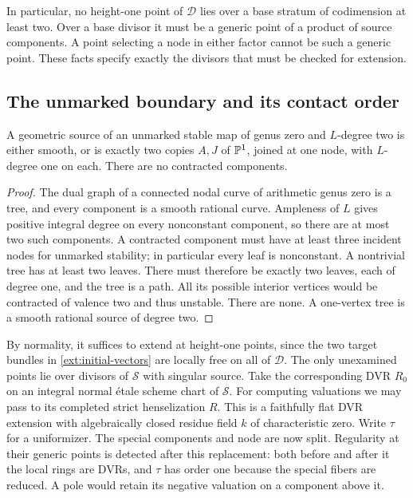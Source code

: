 In particular, no height-one point of $\mathcal D$ lies over a base
stratum of codimension at least two. Over a base divisor it must be
a generic point of a product of source components. A point selecting
a node in either factor cannot be such a generic point. These facts
specify exactly the divisors that must be checked for extension.

\subsection{The unmarked boundary and its contact order}

\begin{lemma}\label{ext:trees}
A geometric source of an unmarked stable map of genus zero and
$L$-degree two is either smooth, or is exactly two copies $A,J$ of
$\mathbb P^1$, joined at one node, with $L$-degree one on each. There are
no contracted components.
\end{lemma}

\begin{proof}
The dual graph of a connected nodal curve of arithmetic genus zero
is a tree, and every component is a smooth rational curve. Ampleness
of $L$ gives positive integral degree on every nonconstant component,
so there are at most two such components. A contracted component
must have at least three incident nodes for unmarked stability;
in particular every leaf is nonconstant. A nontrivial tree has at
least two leaves. There must therefore be exactly two leaves, each
of degree one, and the tree is a path. All its possible interior
vertices would be contracted of valence two and thus unstable.
There are none. A one-vertex tree is a smooth rational source of
degree two.
\end{proof}

By normality, it suffices to extend at height-one points, since the
two target bundles in \eqref{ext:initial-vectors} are locally free
on all of $\mathcal D$. The only unexamined points lie over divisors
of $\mathcal S$ with singular source. Take the corresponding DVR
$R_0$ on an integral normal \'etale scheme chart of $\mathcal S$.
For computing valuations we may pass to its completed strict
henselization $R$. This is a faithfully flat DVR extension with
algebraically closed residue field $k$ of characteristic zero.
Write $\tau$ for a uniformizer. The special components and node
are now split. Regularity at their generic points is detected after
this replacement: both before and after it the local rings are
DVRs, and $\tau$ has order one because the special fibers are
reduced. A pole would retain its negative valuation on a component
above it.

